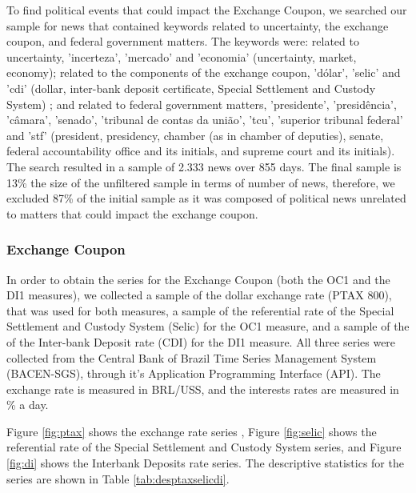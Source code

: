 \documentclass[a4paper]{article}
\begin{document}
To find political events that could impact the Exchange Coupon,  we searched our sample for news that contained keywords related to uncertainty, the exchange coupon, and federal government matters. The keywords were: related to uncertainty, 'incerteza', 'mercado' and 'economia' (uncertainty, market, economy); related to the components of the exchange coupon, 'dólar', 'selic' and 'cdi' (dollar, inter-bank deposit certificate, Special Settlement and Custody System) ; and related to federal government matters, 'presidente', 'presidência', 'câmara', 'senado', 'tribunal de contas da união', 'tcu', 'superior tribunal federal' and 'stf' (president, presidency, chamber (as in chamber of deputies), senate, federal accountability office and its initials, and supreme court and its initials). The search resulted in a sample of 2.333 news over 855 days. The final sample is 13\% the size of the unfiltered sample in terms of number of news, therefore, we excluded 87\% of the initial sample as it was composed of political news unrelated to matters that could impact the exchange coupon.


\subsubsection{Exchange Coupon}

In order to obtain the series for the Exchange Coupon (both the OC1 and the DI1 measures), we collected a sample of the dollar exchange rate (PTAX 800), that was used for both measures, a sample of the referential rate of the Special Settlement and Custody System (Selic) for the OC1 measure, and a sample of the of the Inter-bank Deposit rate (CDI) for the DI1 measure. All three series were collected from the Central Bank of Brazil Time Series Management System (BACEN-SGS), through it's Application Programming Interface (API). The exchange rate is measured in BRL/USS, and the interests rates are measured in \% a day.

Figure \ref{fig:ptax} shows the exchange rate series , Figure \ref{fig:selic} shows the referential rate of the Special Settlement and Custody System series, and Figure \ref{fig:di} shows the Interbank Deposits rate series. The descriptive statistics for the series are shown in Table \ref{tab:desptaxselicdi}.




\end{document}
